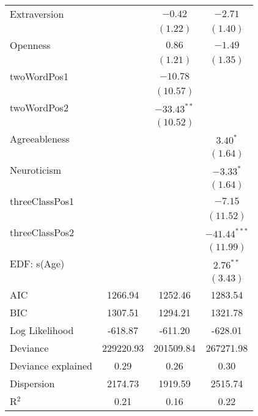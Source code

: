 \begin{table}[!h]
\begin{center}
{\begin{tabular}{l c c c }
	Extraversion          &                & $-0.42$       & $-2.71$        \\
	&                & $(1.22)$      & $(1.40)$       \\
	Openness              &                & $0.86$        & $-1.49$        \\
	&                & $(1.21)$      & $(1.35)$       \\
	twoWordPos1           &                & $-10.78$      &                \\
	&                & $(10.57)$     &                \\
	twoWordPos2           &                & $-33.43^{**}$ &                \\
	&                & $(10.52)$     &                \\
	Agreeableness         &                &               & $3.40^{*}$     \\
	&                &               & $(1.64)$       \\
	Neuroticism           &                &               & $-3.33^{*}$    \\
	&                &               & $(1.64)$       \\
	threeClassPos1        &                &               & $-7.15$        \\
	&                &               & $(11.52)$      \\
	threeClassPos2        &                &               & $-41.44^{***}$ \\
	&                &               & $(11.99)$      \\
	EDF: s(Age)           &                &               & $2.76^{**}$    \\
	&                &               & $(3.43)$       \\
	\hline
	AIC                   & 1266.94        & 1252.46       & 1283.54        \\
	BIC                   & 1307.51        & 1294.21       & 1321.78        \\
	Log Likelihood        & -618.87        & -611.20       & -628.01        \\
	Deviance              & 229220.93      & 201509.84     & 267271.98      \\
	Deviance explained    & 0.29           & 0.26          & 0.30           \\
	Dispersion            & 2174.73        & 1919.59       & 2515.74        \\
	R$^2$                 & 0.21           & 0.16          & 0.22           \\

\end{tabular}}
\end{center}
\end{table}
